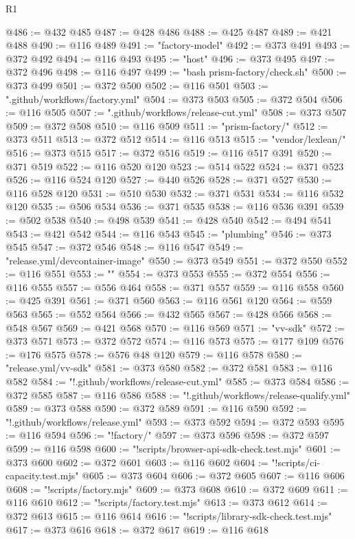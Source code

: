 \begin{lexlean}{R1}
\begin{coremodule}
@486 := @432 @485
@487 := @428 @486
@488 := @425 @487
@489 := @421 @488
@490 := @116 @489
@491 := "factory-model"
@492 := @373 @491
@493 := @372 @492
@494 := @116 @493
@495 := "host"
@496 := @373 @495
@497 := @372 @496
@498 := @116 @497
@499 := "bash prism-factory/check.sh"
@500 := @373 @499
@501 := @372 @500
@502 := @116 @501
@503 := ".github/workflows/factory.yml"
@504 := @373 @503
@505 := @372 @504
@506 := @116 @505
@507 := ".github/workflows/release-cut.yml"
@508 := @373 @507
@509 := @372 @508
@510 := @116 @509
@511 := "prism-factory/"
@512 := @373 @511
@513 := @372 @512
@514 := @116 @513
@515 := "vendor/lexlean/"
@516 := @373 @515
@517 := @372 @516
@519 := @116 @517 @391
@520 := @371 @519
@522 := @116 @520 @120
@523 := @514 @522
@524 := @371 @523
@526 := @116 @524 @120
@527 := @440 @526
@528 := @371 @527
@530 := @116 @528 @120
@531 := @510 @530
@532 := @371 @531
@534 := @116 @532 @120
@535 := @506 @534
@536 := @371 @535
@538 := @116 @536 @391
@539 := @502 @538
@540 := @498 @539
@541 := @428 @540
@542 := @494 @541
@543 := @421 @542
@544 := @116 @543
@545 := "plumbing"
@546 := @373 @545
@547 := @372 @546
@548 := @116 @547
@549 := "release.yml/devcontainer-image"
@550 := @373 @549
@551 := @372 @550
@552 := @116 @551
@553 := ""
@554 := @373 @553
@555 := @372 @554
@556 := @116 @555
@557 := @556 @464
@558 := @371 @557
@559 := @116 @558
@560 := @425 @391
@561 := @371 @560
@563 := @116 @561 @120
@564 := @559 @563
@565 := @552 @564
@566 := @432 @565
@567 := @428 @566
@568 := @548 @567
@569 := @421 @568
@570 := @116 @569
@571 := "vv-sdk"
@572 := @373 @571
@573 := @372 @572
@574 := @116 @573
@575 := @177 @109
@576 := @176 @575
@578 := @576 @48 @120
@579 := @116 @578
@580 := "release.yml/vv-sdk"
@581 := @373 @580
@582 := @372 @581
@583 := @116 @582
@584 := "!.github/workflows/release-cut.yml"
@585 := @373 @584
@586 := @372 @585
@587 := @116 @586
@588 := "!.github/workflows/release-qualify.yml"
@589 := @373 @588
@590 := @372 @589
@591 := @116 @590
@592 := "!.github/workflows/release.yml"
@593 := @373 @592
@594 := @372 @593
@595 := @116 @594
@596 := "!factory/"
@597 := @373 @596
@598 := @372 @597
@599 := @116 @598
@600 := "!scripts/browser-api-sdk-check.test.mjs"
@601 := @373 @600
@602 := @372 @601
@603 := @116 @602
@604 := "!scripts/ci-capacity.test.mjs"
@605 := @373 @604
@606 := @372 @605
@607 := @116 @606
@608 := "!scripts/factory.mjs"
@609 := @373 @608
@610 := @372 @609
@611 := @116 @610
@612 := "!scripts/factory.test.mjs"
@613 := @373 @612
@614 := @372 @613
@615 := @116 @614
@616 := "!scripts/library-sdk-check.test.mjs"
@617 := @373 @616
@618 := @372 @617
@619 := @116 @618

\end{coremodule}
\end{lexlean}
